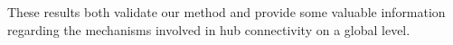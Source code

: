 \documentclass[10pt,letterpaper]{article}
\begin{document}
{%
These results both validate our method and provide some valuable information regarding the mechanisms involved in hub connectivity on a global level.





}
\end{document}
